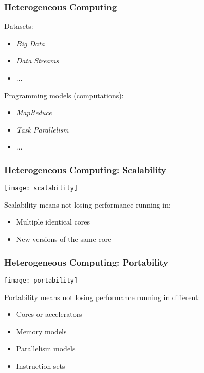 \documentclass[10pt, compress]{beamer}
\begin{document}
\begin{frame}
    \frametitle{Heterogeneous Computing}
    \alert{Datasets}:
    \begin{itemize}
        \item \textit{Big Data}
        \item \textit{Data Streams}
        \item ...
    \end{itemize}

    Programming models (\alert{computations}):
    \begin{itemize}
        \item \textit{MapReduce}
        \item \textit{Task Parallelism}
        \item ...
    \end{itemize}
\end{frame}

\begin{frame}
    \frametitle{Heterogeneous Computing: Scalability}
    \begin{center}
        \texttt{[image: scalability]}
    \end{center}

    \alert{Scalability} means not losing performance running in:
    \begin{itemize}
        \item Multiple identical cores

        \item New versions of the same core
    \end{itemize}
\end{frame}

\begin{frame}
    \frametitle{Heterogeneous Computing: Portability}
    \begin{center}
        \texttt{[image: portability]}
    \end{center}

    \alert{Portability} means not losing performance running in different:
    \begin{itemize}
        \item Cores or \alert{accelerators}

        \item Memory models

        \item Parallelism models

        \item Instruction sets
    \end{itemize}
\end{frame}
\end{document}
